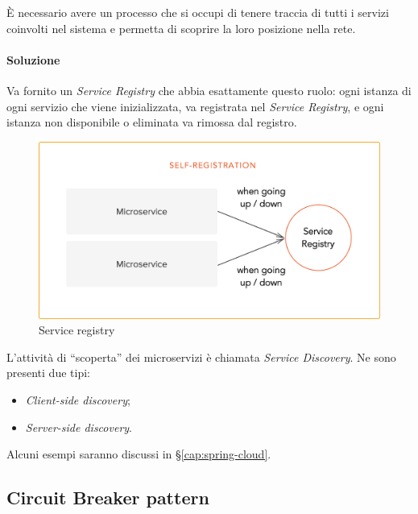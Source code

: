 È necessario avere un processo che si occupi di tenere traccia di tutti i servizi coinvolti nel sistema e permetta di scoprire la loro posizione nella rete.

\paragraph*{Soluzione} Va fornito un \textit{Service Registry} che abbia esattamente questo ruolo:
ogni istanza di ogni servizio che viene inizializzata, va registrata nel \textit{Service Registry}, e ogni istanza non disponibile o eliminata va rimossa dal registro.

\begin{figure}[H]
	\centering
	\includegraphics[width=\textwidth]{immagini/service-registry.png}
	\caption[Esempio di Saga pattern]{Service registry\footnotemark}
\end{figure}

L'attività di ``scoperta'' dei microservizi è chiamata \textit{Service Discovery}. Ne sono presenti due tipi:
\begin{itemize}
	\item \textit{Client-side discovery};
	\item \textit{Server-side discovery}.
\end{itemize}
Alcuni esempi saranno discussi in \S\ref{cap:spring-cloud}.


\subsection{Circuit Breaker pattern}\label{circuit-breaker}

